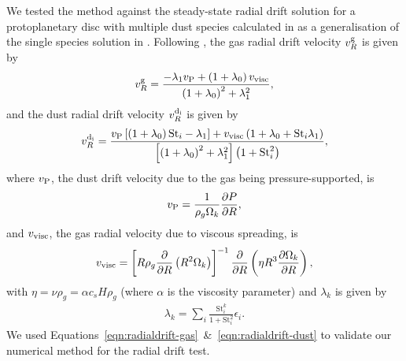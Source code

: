 \documentclass[fleqn,usenatbib]{mnras}
\begin{document}
We tested the method against the steady-state radial drift solution for a
protoplanetary disc with multiple dust species calculated in
\citet{Bai2010ApJ...722.1437B, Dipierro2018MNRAS.479.4187D} as a generalisation
of the single species solution in \citet{Nakagawa1986Icar...67..375N}. Following
\citet{Dipierro2018MNRAS.479.4187D}, the gas radial drift velocity \(v^{\rm
g}_R\) is given by
%
\begin{align}
   \label{eqn:radialdrift-gas}
   v^{\rm g}_R = \frac{-\lambda_1 v_{\rm P} + \left(1 + \lambda_0\right) v_{\rm visc}}
      {\left(1 + \lambda_0\right)^2 + \lambda_1^2},
\end{align}
%
and the dust radial drift velocity \(v^{\rm d_i}_R\) is given by
%
\begin{align}
   \label{eqn:radialdrift-dust}
   v^{\rm d_i}_R = \frac{v_{\rm P} \left[\left(1 + \lambda_0\right) \mathrm{St}_i - \lambda_1\right]
      + v_{\rm visc} \left(1 + \lambda_0 + \mathrm{St}_i \lambda_1\right)}
      {\left[\left(1 + \lambda_0\right)^2 + \lambda_1^2\right] \left(1 + \mathrm{St}_i^2\right)},
\end{align}
%
where \(v_{\rm P}\), the dust drift velocity due to the gas being
pressure-supported, is
%
\begin{align}
   v_{\rm P} = \frac{1}{\rho_g \Omega_k} \frac{\partial P}{\partial R},
\end{align}
%
and \(v_{\rm visc}\), the gas radial velocity due to viscous spreading, is
\begin{align}
   v_{\rm visc} = \left[R \rho_g \frac{\partial}{\partial R} \left(R^2 \Omega_k\right) \right]^{-1}
      \frac{\partial}{\partial R} \left( \eta R^3 \frac{\partial \Omega_k}{\partial R} \right),
\end{align}
%
with \(\eta = \nu \rho_g = \alpha c_s H \rho_g\) (where \(\alpha\) is the
\citet{Shakura1973A&A....24..337S} viscosity parameter) and \(\lambda_k\) is
given by
%
\begin{align}
   \lambda_k = \sum_i \frac{\mathrm{St}^k_i}{1 + \mathrm{St}_i^2} \epsilon_i.
\end{align}
%
We used Equations~\ref{eqn:radialdrift-gas}~\&~\ref{eqn:radialdrift-dust} to
validate our numerical method for the radial drift test.
\end{document}
